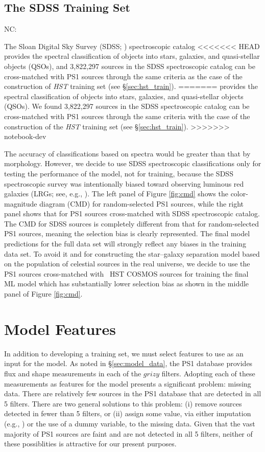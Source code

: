 \documentclass[twocolumn]{aastex62}
\newcommand{\NC}[1]{{\color{brown} NC: {#1}}}
\begin{document}
\subsection{The SDSS Training Set}\label{sec:sdss}
\NC{
The Sloan Digital Sky Survey (SDSS; \citealt{York00}) spectroscopic catalog 
<<<<<<< HEAD
provides the spectral classification of objects into stars, galaxies, and quasi-stellar objects (QSOs), 
and 3,822,297 sources in the SDSS spectroscopic catalog can be cross-matched with PS1 sources 
through the same criteria as the case of the construction of {\it HST} training set (see \S\ref{sec:hst_train}). 
=======
provides the spectral classification of objects into stars, galaxies, and quasi-stellar objects (QSOs). 
We found 3,822,297 sources in the SDSS spectroscopic catalog can be cross-matched with PS1 sources 
through the same criteria with the case of the construction of the {\it HST} training set (see \S\ref{sec:hst_train}). 
>>>>>>> notebook-dev

The accuracy of classifications based on spectra would be greater than that by morphology. 
However, we decide to use SDSS spectroscopic classifications only for testing the performance of the model, 
not for training, 
because the SDSS spectroscopic survey was intentionally biased toward observing 
luminous red galaxies (LRGs; see, e.g., \citealt{Eisenstein01}). 
The left panel of Figure \ref{fig:cmd} shows the color-magnitude diagram (CMD) for random-selected PS1 sources, 
while the right panel shows that for PS1 sources cross-matched with SDSS spectroscopic catalog. 
The CMD for SDSS sources is completely different from that for random-selected PS1 sources, 
meaning the selection bias is clearly represented. 
The final model predictions for the full data set will strongly reflect any biases in the training data set. 
To avoid it and for constructing the star--galaxy separation model 
based on the population of celestial sources in the real universe, 
we decide to use the PS1 sources cross-matched with {\ HST} COSMOS sources for training the final ML model 
which has substantially lower selection bias as shown in the middle panel of Figure \ref{fig:cmd}. 
}

\section{Model Features}\label{sec:model_features}

In addition to developing a training set, we must select features to use as an input for the model. As noted in \S\ref{sec:model_data}, the PS1 database provides flux and shape measurements in each of the $grizy$ filters. Adopting each of these measurements as features for the model presents a significant problem: missing data. There are relatively few sources in the PS1 database that are detected in all 5 filters. There are two general solutions to this problem: (i) remove sources detected in fewer than 5 filters, or (ii) assign some value, via either imputation (e.g., \citealt{Miller17}) or the use of a dummy variable, to the missing data. Given that the vast majority of PS1 sources are faint and are not detected in all 5 filters, neither of these possiblities is attractive for our present purposes.
\end{document}
